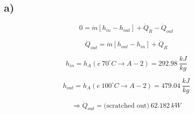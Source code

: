 

\subsection*{a)}

\begin{equation*}
0 = \dot{m} \left[ h_{in} - h_{out} \right] + \dot{Q}_R - \dot{Q}_{out}
\end{equation*}

\begin{equation*}
\dot{Q}_{out} = \dot{m} \left[ h_{out} - h_{in} \right] + \dot{Q}_R
\end{equation*}

\begin{equation*}
h_{in} = h_{A} (e \ 70^\circ C \rightarrow A-2) = 292.98 \ \frac{kJ}{kg}
\end{equation*}

\begin{equation*}
h_{out} = h_{A} (e \ 100^\circ C \rightarrow A-2) = 479.04 \ \frac{kJ}{kg}
\end{equation*}

\begin{equation*}
\Rightarrow \dot{Q}_{out} = \text{(scratched out)} \ 62.182 \ kW
\end{equation*}